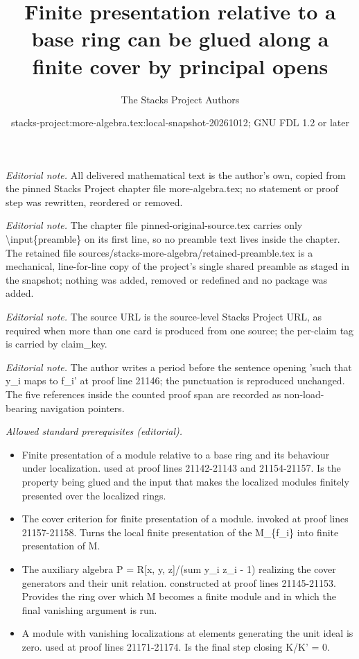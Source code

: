 \documentclass[10pt,a4paper]{amsart}
\title{Finite presentation relative to a base ring can be glued along a finite cover by principal opens}
\author{The Stacks Project Authors}
\date{stacks-project:more-algebra.tex:local-snapshot-20261012; GNU FDL 1.2 or later}
\theoremstyle{plain}
\theoremstyle{definition}
\theoremstyle{remark}
\numberwithin{equation}{subsection}
\begin{document}
\maketitle
\setcounter{subsection}{1}
\noindent\textit{Editorial note.} All delivered mathematical text is the author's own, copied from the pinned Stacks Project chapter file more-algebra.tex; no statement or proof step was rewritten, reordered or removed.\par\medskip
\noindent\textit{Editorial note.} The chapter file pinned-original-source.tex carries only \textbackslash{}input\{preamble\} on its first line, so no preamble text lives inside the chapter. The retained file sources/stacks-more-algebra/retained-preamble.tex is a mechanical, line-for-line copy of the project's single shared preamble as staged in the snapshot; nothing was added, removed or redefined and no package was added.\par\medskip
\noindent\textit{Editorial note.} The source URL is the source-level Stacks Project URL, as required when more than one card is produced from one source; the per-claim tag is carried by claim\_key.\par\medskip
\noindent\textit{Editorial note.} The author writes a period before the sentence opening 'such that y\_i maps to f\_i' at proof line 21146; the punctuation is reproduced unchanged. The five references inside the counted proof span are recorded as non-load-bearing navigation pointers.\par\medskip
\noindent\textit{Allowed standard prerequisites (editorial).}\begin{itemize}
\item Finite presentation of a module relative to a base ring and its behaviour under localization. used at proof lines 21142-21143 and 21154-21157. Is the property being glued and the input that makes the localized modules finitely presented over the localized rings.
\item The cover criterion for finite presentation of a module. invoked at proof lines 21157-21158. Turns the local finite presentation of the M\_\{f\_i\} into finite presentation of M.
\item The auxiliary algebra P = R[x, y, z]/(sum y\_i z\_i - 1) realizing the cover generators and their unit relation. constructed at proof lines 21145-21153. Provides the ring over which M becomes a finite module and in which the final vanishing argument is run.
\item A module with vanishing localizations at elements generating the unit ideal is zero. used at proof lines 21171-21174. Is the final step closing K/K' = 0.
\end{itemize}\medskip
\end{document}
